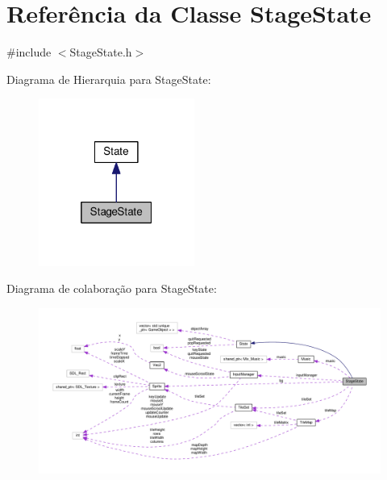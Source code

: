 \hypertarget{classStageState}{\section{Referência da Classe Stage\+State}
\label{classStageState}
}


{\ttfamily \#include $<$Stage\+State.\+h$>$}



Diagrama de Hierarquia para Stage\+State\+:\nopagebreak
\begin{figure}[H]
\begin{center}
\leavevmode
\includegraphics[width=145pt]{classStageState__inherit__graph}
\end{center}
\end{figure}


Diagrama de colaboração para Stage\+State\+:\nopagebreak
\begin{figure}[H]
\begin{center}
\leavevmode
\includegraphics[width=350pt]{classStageState__coll__graph}
\end{center}
\end{figure}
